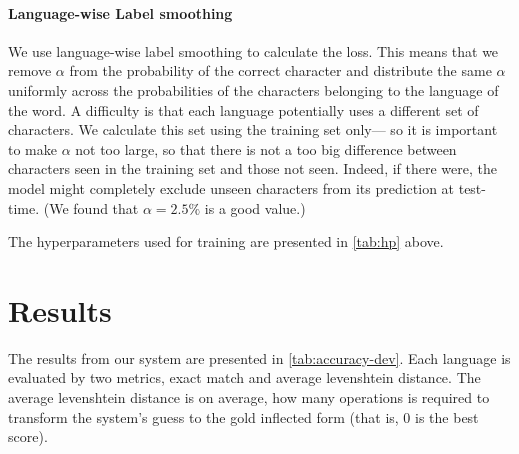 \documentclass[11pt,a4paper]{article}
\begin{document}
\paragraph{Language-wise Label smoothing} We use language-wise label
smoothing to calculate the loss. This means that we remove $\alpha$
from the probability of the correct character and distribute the same
$\alpha$ uniformly across the probabilities of the characters
belonging to the language of the word. A difficulty is that each
language potentially uses a different set of characters. We calculate
this set using the training set only--- so it is important to make
$\alpha$ not too large, so that there is not a too big difference
between characters seen in the training set and those not seen.
Indeed, if there were, the model might completely exclude unseen
characters from its prediction at test-time. (We found that
\(\alpha=2.5\%\) is a good value.)


The hyperparameters used for training are presented in \cref{tab:hp} above.


\section{Results}


The results from our system are presented in
\cref{tab:accuracy-dev}. Each language is evaluated by two metrics,
exact match and average levenshtein distance. The average levenshtein
distance is on average, how many operations is required to transform
the system's guess to the gold inflected form (that is, $0$ is the
best score).
\end{document}
